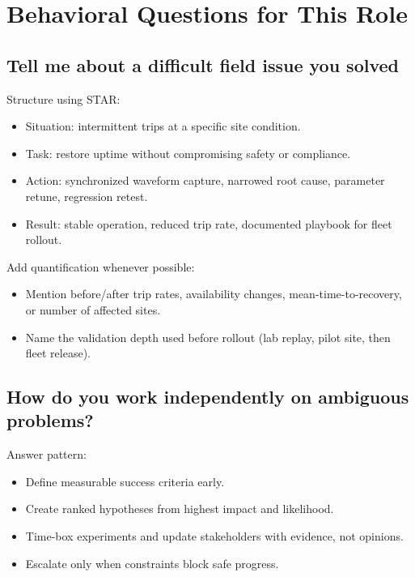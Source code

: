 \documentclass[11pt]{article}
\begin{document}
\section{Behavioral Questions for This Role}

\subsection{Tell me about a difficult field issue you solved}
Structure using STAR:
\begin{itemize}
  \item Situation: intermittent trips at a specific site condition.
  \item Task: restore uptime without compromising safety or compliance.
  \item Action: synchronized waveform capture, narrowed root cause, parameter retune, regression retest.
  \item Result: stable operation, reduced trip rate, documented playbook for fleet rollout.
\end{itemize}

Add quantification whenever possible:
\begin{itemize}
  \item Mention before/after trip rates, availability changes, mean-time-to-recovery, or number of affected sites.
  \item Name the validation depth used before rollout (lab replay, pilot site, then fleet release).
\end{itemize}

\subsection{How do you work independently on ambiguous problems?}
Answer pattern:
\begin{itemize}
  \item Define measurable success criteria early.
  \item Create ranked hypotheses from highest impact and likelihood.
  \item Time-box experiments and update stakeholders with evidence, not opinions.
  \item Escalate only when constraints block safe progress.
\end{itemize}
\end{document}
